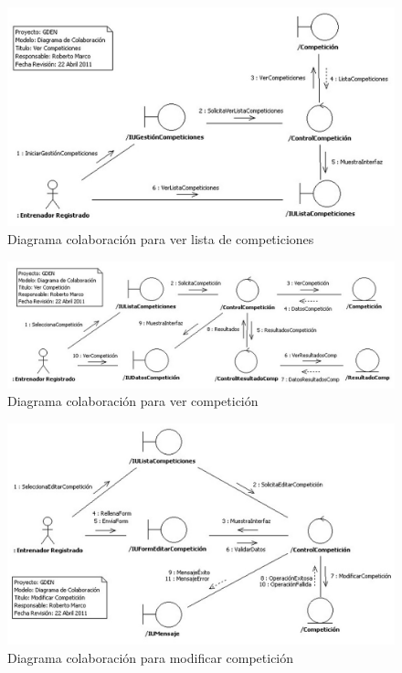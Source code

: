 			\begin{figure}[H]
			  \centering
			    \includegraphics[width=16cm]{./eps/colaboraciones/gestion_competiciones/VerListaCompeticiones.eps}
			  \caption{Diagrama colaboración para ver lista de competiciones}
			  \label{fig:col_ver_lista_competiciones}
			\end{figure}
			
			\begin{figure}[H]
			  \centering
			    \includegraphics[width=16cm]{./eps/colaboraciones/gestion_competiciones/VerCompeticion.eps}
			  \caption{Diagrama colaboración para ver competición}
			  \label{fig:col_ver_competicion}
			\end{figure}
			
			\begin{figure}[H]
			  \centering
			    \includegraphics[width=16cm]{./eps/colaboraciones/gestion_competiciones/ModificarCompeticion.eps}
			  \caption{Diagrama colaboración para modificar competición}
			  \label{fig:col_modificar_competicion}
			\end{figure}
			
